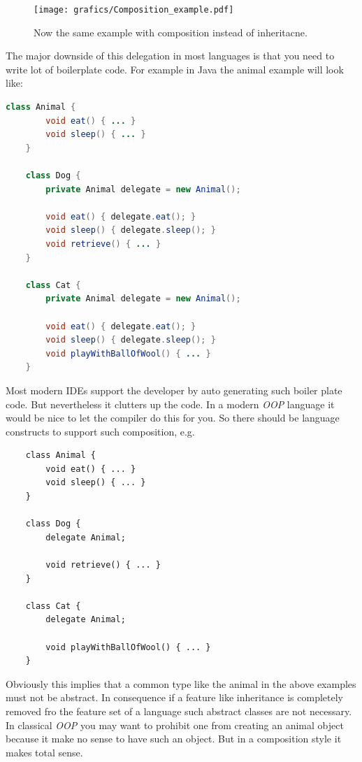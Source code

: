 \documentclass[11pt, a4paper]{report}
\begin{document}
\begin{figure}[ht]
    \centering
    \texttt{[image: grafics/Composition\_example.pdf]}
    \caption{Now the same example with composition instead of inheritacne.}
    \label{fig:Composition_example}
\end{figure}

The major downside of this delegation in most languages is that you need to write lot of boilerplate code. For example in Java the animal example will look like:

\begin{lstlisting}[language=Java]
    class Animal {
        void eat() { ... }
        void sleep() { ... }
    }
    
    class Dog {
        private Animal delegate = new Animal();
        
        void eat() { delegate.eat(); }
        void sleep() { delegate.sleep(); }
        void retrieve() { ... }
    }
    
    class Cat {
        private Animal delegate = new Animal();
    
        void eat() { delegate.eat(); }
        void sleep() { delegate.sleep(); }
        void playWithBallOfWool() { ... }
    }
\end{lstlisting}

Most modern IDEs support the developer by auto generating such boiler plate code. But nevertheless it clutters up the code. In a modern \textit{OOP} language it would be nice to let the compiler do this for you. So there should be language constructs to support such composition, e.g.

\begin{lstlisting}
    class Animal {
        void eat() { ... }
        void sleep() { ... }
    }
    
    class Dog {
        delegate Animal;
        
        void retrieve() { ... }
    }
    
    class Cat {
        delegate Animal;
    
        void playWithBallOfWool() { ... }
    }
\end{lstlisting}

Obviously this implies that a common type like the animal in the above examples must not be abstract. In consequence if a feature like inheritance is completely removed fro the feature set of a language such abstract classes are not necessary. In classical \textit{OOP} you may want to prohibit one from creating an animal object because it make no sense to have such an object. But in a composition style it makes total sense.
\end{document}
